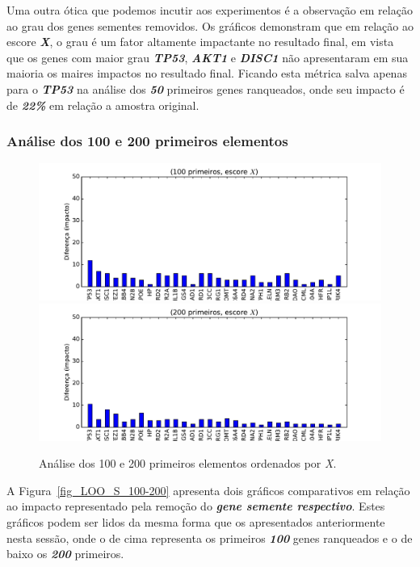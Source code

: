 %
Uma outra ótica que podemos incutir aos experimentos é a observação em relação ao grau dos genes sementes removidos. Os gráficos demonstram que em relação ao escore \textsl{\textbf{X}}, o grau é um fator altamente impactante no resultado final, em vista que os genes com maior grau \textsl{\textbf{TP53}}, \textsl{\textbf{AKT1}} e \textsl{\textbf{DISC1}} não apresentaram em sua maioria os maires impactos no resultado final. Ficando esta métrica salva apenas para o \textsl{\textbf{TP53}} na análise dos \textsl{\textbf{50}} primeiros genes ranqueados, onde seu impacto é de \textsl{\textbf{22\%}} em relação a amostra original.

%


%
%
\subsubsection{Análise dos 100 e 200 primeiros elementos}
%
\begin{figure}[ht!]
\includegraphics[width=1\textwidth]{Images/analyses/fig_LOO_X_100.pdf}
\includegraphics[width=1\textwidth]{Images/analyses/fig_LOO_X_200.pdf}
\caption {Análise dos 100 e 200 primeiros elementos ordenados por \textit{X}.
\label{fig_LOO_X_100-200}}
\end{figure}
%
%

A Figura~\ref{fig_LOO_S_100-200} apresenta dois gráficos comparativos em relação ao impacto representado pela remoção do \textsl{\textbf{gene semente respectivo}}. Estes gráficos podem ser lidos da mesma forma que os apresentados anteriormente nesta sessão, onde o de cima representa os primeiros \textsl{\textbf{100}} genes ranqueados e o de baixo os \textsl{\textbf{200}} primeiros.
%

